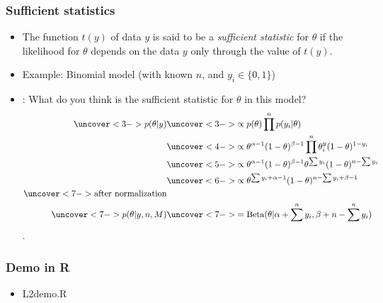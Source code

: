 \documentclass[10pt]{beamer}
\begin{document}
\begin{frame}
  \frametitle{Sufficient statistics}

\begin{itemize}
  \item The function $t(y)$ of data $y$ is said to be a {\em sufficient statistic} for $\theta$ if the likelihood for $\theta$ depends on the
data $y$ only through the value of $t(y)$.
  \item Example: Binomial model (with known $n$, and $y_i \in \{0,1\}$)
  \item<2-> : What do you think is the sufficient
    statistic for $\theta$ in this model?
  \begin{align*}
      \uncover<3->{p(\theta|y)} &\uncover<3->{ \propto p(\theta) \prod^n p(y_i | \theta)} \\
      &\uncover<4->{ \propto \theta^{\alpha-1} (1-\theta)^{\beta-1} \prod^n\theta^y_i (1-\theta)^{1-y_i}} \\
      &\uncover<5->{ \propto \theta^{\alpha-1} (1-\theta)^{\beta-1} \theta^{\sum y_i} (1-\theta)^{n - \sum y_i}} \\
      &\uncover<6->{ \propto
        \theta^{\sum y_i+\alpha-1} (1-\theta)^{n-\sum y_i+\beta-1}}\\
      \uncover<7->{\text{after normalization}} &\\
      \uncover<7->{p(\theta|y,n,M)}
      &\uncover<7->{ = \text{Beta}(\theta|\alpha+\sum^n y_i,\beta+n-\sum^n y_i)}
  \end{align*}
  .
\end{itemize}

\end{frame}


\begin{frame}
  \frametitle{Demo in R}

  \begin{itemize}
  \item L2demo.R
  \end{itemize}

\end{frame}
\end{document}
